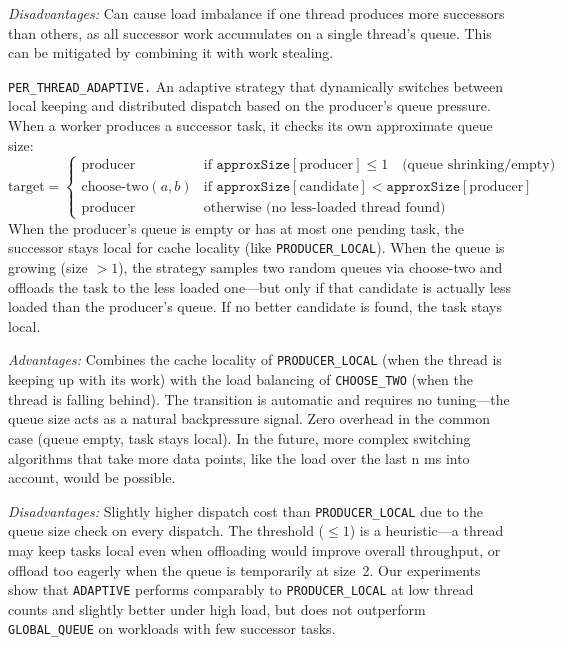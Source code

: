 \textit{Disadvantages:} Can cause load imbalance if one thread produces more successors than others, as all successor work accumulates on a single thread's queue.
This can be mitigated by combining it with work stealing.

\texttt{PER\_THREAD\_ADAPTIVE.}
An adaptive strategy that dynamically switches between local keeping and distributed dispatch based on the producer's queue pressure.
When a worker produces a successor task, it checks its own approximate queue size:
\[
    \text{target} =
    \begin{cases}
        \text{producer} & \text{if } \texttt{approxSize}[\text{producer}] \leq 1 \quad \text{(queue shrinking/empty)} \\
        \text{choose-two}(a, b) & \text{if } \texttt{approxSize}[\text{candidate}] < \texttt{approxSize}[\text{producer}] \\
        \text{producer} & \text{otherwise (no less-loaded thread found)}
    \end{cases}
\]
When the producer's queue is empty or has at most one pending task, the successor stays local for cache locality (like \texttt{PRODUCER\_LOCAL}).
When the queue is growing (size $> 1$), the strategy samples two random queues via choose-two and offloads the task to the less loaded one---but only if that candidate is actually less loaded than the producer's queue.
If no better candidate is found, the task stays local.

\textit{Advantages:} Combines the cache locality of \texttt{PRODUCER\_LOCAL} (when the thread is keeping up with its work) with the load balancing of \texttt{CHOOSE\_TWO} (when the thread is falling behind).
The transition is automatic and requires no tuning---the queue size acts as a natural backpressure signal.
Zero overhead in the common case (queue empty, task stays local). In the future, more complex switching algorithms that take more data points, like the load over the last n ms into account, would be possible.

\textit{Disadvantages:} Slightly higher dispatch cost than \texttt{PRODUCER\_LOCAL} due to the queue size check on every dispatch.
The threshold ($\leq 1$) is a heuristic---a thread may keep tasks local even when offloading would improve overall throughput, or offload too eagerly when the queue is temporarily at size~2.
Our experiments show that \texttt{ADAPTIVE} performs comparably to \texttt{PRODUCER\_LOCAL} at low thread counts and slightly better under high load, but does not outperform \texttt{GLOBAL\_QUEUE} on workloads with few successor tasks.

